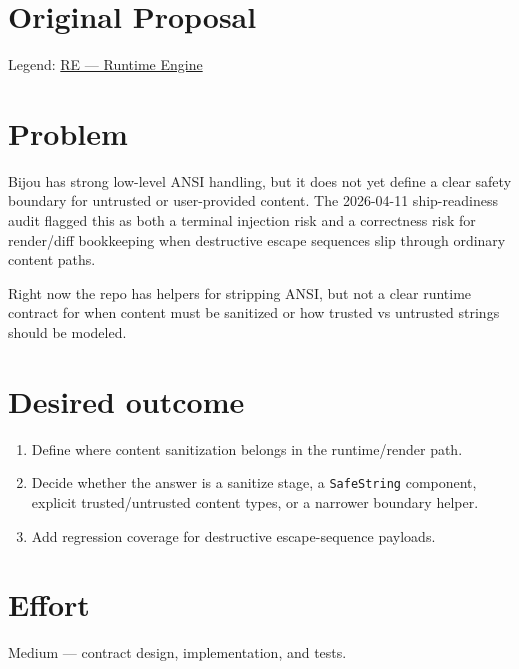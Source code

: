 \section{Original Proposal}\label{record-381-original-proposal}

Legend: \href{https://github.com/flyingrobots/bijou/blob/1853ad902f6bf219326409e7f743a5a1d6517dbc/docs/method/legends/RE-runtime-engine.md}{RE --- Runtime Engine}

\section{Problem}\label{record-381-problem}

Bijou has strong low-level ANSI handling, but it does not yet define a clear safety boundary for untrusted or user-provided content. The 2026-04-11 ship-readiness audit flagged this as both a terminal injection risk and a correctness risk for render/diff bookkeeping when destructive escape sequences slip through ordinary content paths.

Right now the repo has helpers for stripping ANSI, but not a clear runtime contract for when content must be sanitized or how trusted vs untrusted strings should be modeled.

\section{Desired outcome}\label{record-381-desired-outcome}

\begin{enumerate}
\def\labelenumi{\arabic{enumi}.}
\tightlist
\item
  Define where content sanitization belongs in the runtime/render path.
\item
  Decide whether the answer is a sanitize stage, a \texttt{S\allowbreak{}a\allowbreak{}f\allowbreak{}e\allowbreak{}S\allowbreak{}t\allowbreak{}r\allowbreak{}i\allowbreak{}n\allowbreak{}g} component, explicit trusted/untrusted content types, or a narrower boundary helper.
\item
  Add regression coverage for destructive escape-sequence payloads.
\end{enumerate}

\section{Effort}\label{record-381-effort}

Medium --- contract design, implementation, and tests.

